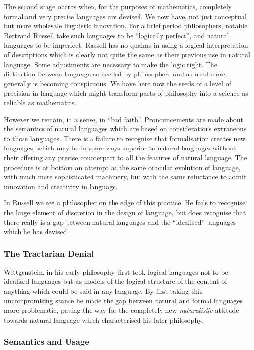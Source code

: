 The second stage occurs when, for the purposes of mathematics, completely formal and very precise languages are devised.
We now have, not just conceptual but more wholesale linguistic innovation.
For a brief period philosophers, notable Bertrand Russell take such languages to be ``logically perfect'', and natural languages to be imperfect.
Russell has no qualms in using a logical interpretation of descriptions which is clearly not quite the same as their previous use in natural language.
Some adjustments are necessary to make the logic right.
The distinction between language as needed by philosophers and as used more generally is becoming conspicuous.
We have here now the seeds of a level of precision in language which might transform parts of philosophy into a science as reliable as mathematics.

However we remain, in a sense, in ``bad faith''.
Pronouncements are made about the semantics of natural languages which are based on considerations extraneous to those languages.
There is a failure to recognise that formalisation creates new languages, which may be in some ways superior to natural languages without their offering any precise counterpart to all the features of natural language.
The procedure is at bottom an attempt at the same oracular evolution of language, with much more sophisticated machinery, but with the same reluctance to admit innovation and creativity in language.

In Russell we see a philosopher on the edge of this practice.
He fails to recognise the large element of discretion in the design of language, but does recognise that there really is a gap between natural languages and the ``idealised'' languages which he has devised.

\subsubsection{The Tractarian Denial}

Wittgenstein, in his early philosophy, first took logical languages not to be idealised languages but as models of the logical structure of the content of anything which could be said in any language.
By first taking this uncompromising stance he made the gap between natural and formal languages more problematic, paving the way for the completely new {\it naturalistic} attitude towards natural language which characterised his later philosophy.

\subsubsection{Semantics and Usage}

